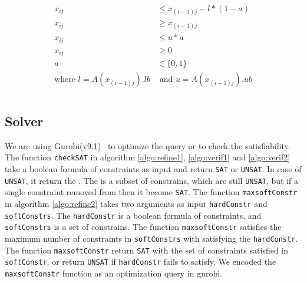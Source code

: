 \begin{align}
    \label{eq:reluexact}
    \begin{split}
        x_{ij} &\leq x_{(i-1)j} - l*(1-a) \\
        x_{ij} &\geq x_{(i-1)j} \\
        x_{ij} &\leq u*a \\
        x_{ij} &\geq 0 \\
        a &\in \{0,1\} \\ 
        \text{where }l = A(x_{(i-1)j}).lb &\text{ and }u = A(x_{(i-1)j}).ub \\
    \end{split}
\end{align}


\subsection{Solver}
\label{sec:solver}

We are using Gurobi(v9.1)~\cite{gurobioptimizer} to optimize the query or to check the satisfiability. 
The function \texttt{checkSAT} in algorithm \ref{algo:refine1}, \ref{algo:verif1} and \ref{algo:verif2} 
take a boolean formula of constraints as input and return \texttt{SAT} or \texttt{UNSAT}. 
In case of \texttt{UNSAT}, it return the \unsatcore{}. 
The \unsatcore{} is a subset of constrains, which are still \texttt{UNSAT}, 
but if a single constraint removed from \unsatcore then it become \texttt{SAT}.
The function \texttt{maxsoftConstr} in algorithm \ref{algo:refine2} takes two arguments as input \texttt{hardConstr} and \texttt{softConstrs}. 
The \texttt{hardConstr} is a boolean formula of constraints, and \texttt{softConstrs} is a set of constrains. 
The function \texttt{maxsoftConstr} satisfies the maximum number of constraints in \texttt{softConstrs} with satisfying the \texttt{hardConstr}. 
The function \texttt{maxsoftConstr} return \texttt{SAT} with the set of constraints satisfied in \texttt{softConstr}, or return
\texttt{UNSAT} if \texttt{hardConstr} fails to satisfy. We encoded the \texttt{maxsoftConstr} function as an optimization 
query in gurobi. 



